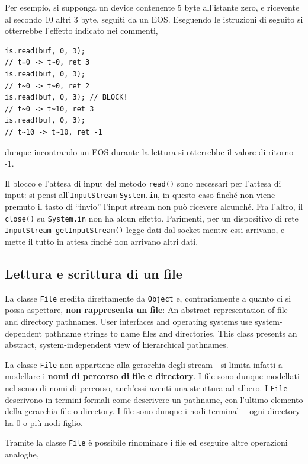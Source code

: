 \documentclass[\fontsizeclass,twocolumn]{\classname}
\theoremstyle{definition}
\theoremstyle{definition}
\begin{document}
Per esempio, si supponga un device contenente 5 byte all'istante zero, e
ricevente al secondo 10 altri 3 byte, seguiti da un EOS. Eseguendo le
istruzioni di seguito si otterrebbe l'effetto indicato nei commenti,

\begin{lstlisting}
is.read(buf, 0, 3);
// t=0 -> t~0, ret 3
is.read(buf, 0, 3);
// t~0 -> t~0, ret 2
is.read(buf, 0, 3); // BLOCK!
// t~0 -> t~10, ret 3
is.read(buf, 0, 3);
// t~10 -> t~10, ret -1
\end{lstlisting}

dunque incontrando un EOS durante la lettura si otterrebbe il valore di ritorno
-1.

Il blocco e l'attesa di input del metodo \texttt{read()} sono necessari per
l'attesa di input: si pensi all'\texttt{Input\-Stream} \texttt{System.in}, in
questo caso finché non viene premuto il tasto di ``invio'' l'input stream non
può ricevere alcunché. Fra l'altro, il \texttt{close()} su \texttt{System.in}
non ha alcun effetto. Parimenti, per un dispositivo di rete \texttt{InputStream
getInputStream()} legge dati dal socket mentre essi arrivano, e mette il tutto
in attesa finché non arrivano altri dati.

\subsection{Lettura e scrittura di un file}

La classe \texttt{File} eredita direttamente da \texttt{Object} e,
contrariamente a quanto ci si possa aspettare, \textbf{non rappresenta un
file}: {\footnotesize An abstract representation of file and directory pathnames.
User interfaces and operating systems use system-dependent pathname strings to
name files and directories. This class presents an abstract, system-independent
view of hierarchical pathnames.}

La classe \texttt{File} non appartiene alla gerarchia degli stream \-- si
limita infatti a modellare i \textbf{nomi di percorso di file e directory}. I
file sono dunque modellati nel senso di nomi di percorso, anch'essi aventi una
struttura ad albero. I \texttt{File} descrivono in termini formali come
descrivere un pathname, con l'ultimo elemento della gerarchia file o directory.
I file sono dunque i nodi terminali \-- ogni directory ha 0 o più nodi figlio.

Tramite la classe \texttt{File} è possibile rinominare i file ed eseguire altre
operazioni analoghe,
\end{document}
